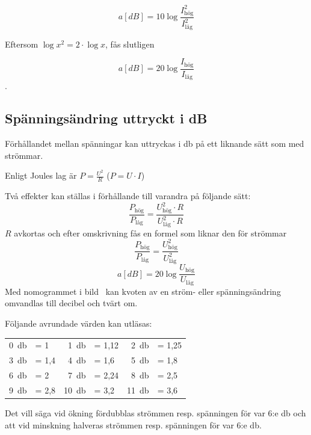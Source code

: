 \[a[dB] = 10\log \dfrac{I_{\text{hög}}^2}{I_{\text{låg}}^2}\]

Eftersom \(\log x^2 = 2 \cdot \log x\), fås slutligen

\[a[dB] = 20\log \dfrac{I_{\text{hög}}}{I_{\text{låg}}}\].

\subsection{Spänningsändring uttryckt i dB}

Förhållandet mellan spänningar kan uttryckas i \unit{\decibel} på ett liknande
sätt som med strömmar.

Enligt Joules lag är \(P = \frac{U^2}{R}\) (\(P = U \cdot I\))

Två effekter kan ställas i förhållande till varandra på följande sätt:
\[\dfrac{P_{\text{hög}}}{P_{\text{låg}}}=\dfrac{U_{\text{hög}}^2 \cdot R}{U_{\text{låg}}^2 \cdot R}\]
\(R\) avkortas och efter omskrivning fås en formel som liknar den för strömmar
\[\dfrac{P_{\text{hög}}}{P_{\text{låg}}} = \dfrac{U_{\text{hög}}^2}{U_{\text{låg}}^2}\]
\[a[dB] = 20\log \dfrac{U_{\text{hög}}}{U_{\text{låg}}}\]
Med nomogrammet i bild~ kan kvoten av en
ström- eller spänningsändring omvandlas till decibel och tvärt om.


Följande avrundade värden kan utläsas:

\begin{center}
\begin{tabular}{rlrlrl}
\qty{0}{\decibel}  & = 1    & \qty{1}{\decibel}  & = 1,12 & \qty{2}{\decibel}  & = 1,25 \\
\qty{3}{\decibel}  & = 1,4  & \qty{4}{\decibel}  & = 1,6  & \qty{5}{\decibel}  & = 1,8  \\
\qty{6}{\decibel}  & = 2    & \qty{7}{\decibel}  & = 2,24 & \qty{8}{\decibel}  & = 2,5  \\
\qty{9}{\decibel}  & = 2,8  & \qty{10}{\decibel} & = 3,2  & \qty{11}{\decibel} & = 3,6
\end{tabular}
\end{center}

Det vill säga vid ökning fördubblas strömmen resp. spänningen för var 6:e
\unit{\decibel} och att vid minskning halveras strömmen resp. spänningen för var
6:e \unit{\decibel}.

